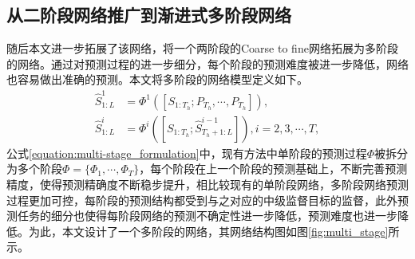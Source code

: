 \subsection{从二阶段网络推广到渐进式多阶段网络}
随后本文进一步拓展了该网络，将一个两阶段的Coarse to fine网络拓展为多阶段的网络。通过对预测过程的进一步细分，每个阶段的预测难度被进一步降低，网络也容易做出准确的预测。本文将多阶段的网络模型定义如下。
\begin{equation}
    \begin{aligned}
         \hat{S}_{1:L}^{1} &= \Phi^1([{S}_{1:T_h};P_{T_h},\cdots,P_{T_h}]), \\
        \hat{S}_{1:L}^{i} &= \Phi^i([S_{1:T_h};\hat{S}_{T_h+1:L}^{i-1}]), i = {2,3,\cdots,T},
    \end{aligned}
    \label{equation:multi-stage_formulation}
\end{equation}
公式\ref{equation:multi-stage_formulation}中，现有方法中单阶段的预测过程$\Phi$被拆分为多个阶段$\Phi = \{ \Phi_1, \cdots, \Phi_T\}$，每个阶段在上一个阶段的预测基础上，不断完善预测精度，使得预测精确度不断稳步提升，相比较现有的单阶段网络，多阶段网络预测过程更加可控，每阶段的预测结构都受到与之对应的中级监督目标的监督，此外预测任务的细分也使得每阶段网络的预测不确定性进一步降低，预测难度也进一步降低。为此，本文设计了一个多阶段的网络，其网络结构图如图\ref{fig:multi_stage}所示。


